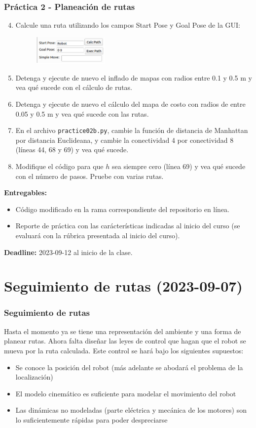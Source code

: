 \begin{frame}\frametitle{Práctica 2 - Planeación de rutas}
  \begin{enumerate}
    \setcounter{enumi}{3}
  \item Calcule una ruta utilizando los campos Start Pose y Goal Pose de la GUI:
    \begin{figure}
      \centering
      \includegraphics[width=0.35\textwidth]{Figures/GUIPathPlanning.png}
    \end{figure}
  \item Detenga y ejecute de nuevo el inflado de mapas con radios entre 0.1 y 0.5 m y vea qué sucede con el cálculo de rutas.
  \item Detenga y ejecute de nuevo el cálculo del mapa de costo con radios de entre 0.05 y 0.5 m y vea qué sucede con las rutas. 
  \item En el archivo \texttt{practice02b.py}, cambie la función de distancia de Manhattan por distancia Euclideana, y cambie la conectividad 4 por conectividad 8 (líneas 44, 68 y 69) y vea qué sucede.
  \item Modifique el código para que $h$ sea siempre cero (línea 69) y vea qué sucede con el número de pasos. Pruebe con varias rutas. 
  \end{enumerate}
  \textbf{Entregables:}
  \begin{itemize}
  \item Código modificado en la rama correspondiente del repositorio en línea.
  \item Reporte de práctica con las carácterísticas indicadas al inicio del curso (se evaluará con la rúbrica presentada al inicio del curso). 
  \end{itemize}
  \textbf{Deadline: } 2023-09-12 al inicio de la clase. 
\end{frame}

\section{Seguimiento de rutas (2023-09-07)}
\begin{frame}\frametitle{Seguimiento de rutas}
  Hasta el momento ya se tiene una representación del ambiente y una forma de planear rutas. Ahora falta diseñar las leyes de control que hagan que el robot se mueva por la ruta calculada. Este control se hará bajo los siguientes supuestos:
  \begin{itemize}
  \item Se conoce la posición del robot (más adelante se abodará el problema de la localización)
  \item El modelo cinemático es suficiente para modelar el movimiento del robot 
  \item Las dinámicas no modeladas (parte eléctrica y mecánica de los motores) son lo suficientemente rápidas para poder despreciarse
  \end{itemize}
\end{frame}

